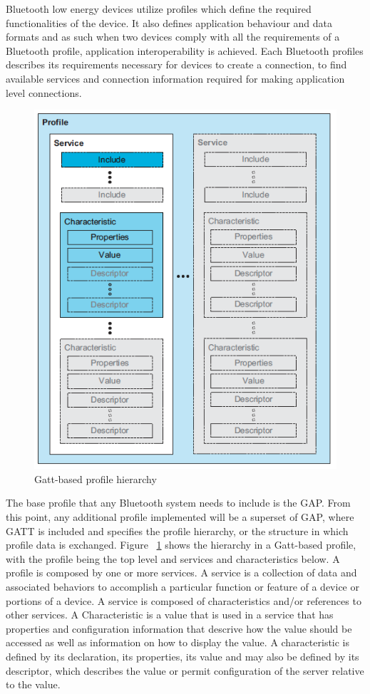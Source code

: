 \documentclass[a4paper]{IEEEtran}
\begin{document}
Bluetooth low energy devices utilize profiles which define the required functionalities of the device. It also defines application behaviour and data formats and as such when two devices comply with all the requirements of a Bluetooth profile, application interoperability is achieved. Each Bluetooth profiles describes its requirements necessary for devices to create a connection, to find available services and connection information required for making application level connections.

\begin{figure}
	\centering
		\includegraphics[width=0.5\linewidth]{figures/profile.png}
	\caption[Gatt-based profile hierarchy]{Gatt-based profile hierarchy}
	\label{fig:profile}
\end{figure}

The base profile that any Bluetooth system needs to include is the GAP. From this point, any additional profile implemented will be a superset of GAP, where GATT is included and specifies the profile hierarchy, or the structure in which profile data is exchanged. Figure  ~\ref{fig:profile} shows the hierarchy in a Gatt-based profile, with the profile being the top level and services and characteristics below. 
A profile is composed by one or more services. A service is a collection of data and associated behaviors to accomplish a particular function or feature of a device or portions of a device. A service is composed of characteristics and/or references to other services.
A Characteristic is a value that is used in a service that has properties and configuration information that descrive how the value should be accessed as well as information on how to display the value. A characteristic is defined by its declaration, its properties, its value and may also be defined by its descriptor, which describes the value or permit configuration of the server relative to the value.
\end{document}
